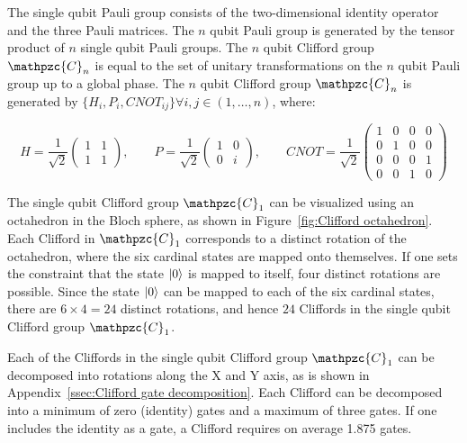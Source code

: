       The single qubit Pauli group consists of the two-dimensional identity operator and the three Pauli matrices. The $n$ qubit Pauli group is generated by the tensor product of $n$ single qubit Pauli groups. The $n$ qubit Clifford group $\mathpzc{C}_n$ is equal to the set of unitary transformations on the $n$ qubit Pauli group up to a global phase. The $n$ qubit Clifford group $\mathpzc{C}_n$ is generated by $\{H_i, P_i, CNOT_{ij}\} \forall i, j \in (1, \dots, n)$, where:

      \begin{equation}
        H =
        \frac{1}{\sqrt{2}}
        \begin{pmatrix}
          1 & 1 \\
          1 & 1
        \end{pmatrix}, \qquad
        P =
        \frac{1}{\sqrt{2}}
        \begin{pmatrix}
          1 & 0 \\
          0 & i
        \end{pmatrix}, \qquad
        CNOT =
        \frac{1}{\sqrt{2}}
        \begin{pmatrix}
          1 & 0 & 0 & 0 \\
          0 & 1 & 0 & 0 \\
          0 & 0 & 0 & 1 \\
          0 & 0 & 1 & 0
        \end{pmatrix}
      \end{equation}

      The single qubit Clifford group $\mathpzc{C}_1$ can be visualized using an octahedron in the Bloch sphere, as shown in Figure~\ref{fig:Clifford octahedron}. Each Clifford in $\mathpzc{C}_1$ corresponds to a distinct rotation of the octahedron, where the six cardinal states are mapped onto themselves. If one sets the constraint that the state $\ket{0}$ is mapped to itself, four distinct rotations are possible. Since the state $\ket{0}$ can be mapped to each of the six cardinal states, there are $6 \times 4=24$ distinct rotations, and hence $24$ Cliffords in the single qubit Clifford group $\mathpzc{C}_1$.

      Each of the Cliffords in the single qubit Clifford group $\mathpzc{C}_1$ can be decomposed into rotations along the X and Y axis, as is shown in Appendix~\ref{ssec:Clifford gate decomposition}. Each Clifford can be decomposed into a minimum of zero (identity) gates and a maximum of three gates. If one includes the identity as a gate, a Clifford requires on average 1.875 gates.

